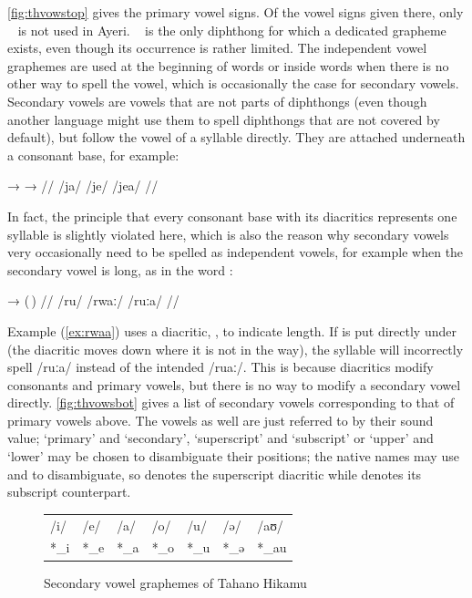 \autoref{fig:thvowstop} gives the primary vowel signs. Of the vowel signs given 
there, only ~ is not used in Ayeri. ~ is the 
only diphthong for which a dedicated grapheme exists, even though its occurrence 
is rather limited. The independent vowel graphemes are used at the beginning of 
words or inside words when there is no other way to spell the vowel, which is 
occasionally the case for secondary vowels. Secondary vowels are vowels that are 
not parts of diphthongs (even though another language might use them to spell 
diphthongs that are not covered by default), but follow the vowel of a syllable 
directly. They are attached underneath a consonant base, for example:

\ex[lingstyle=thex]\begingl
	\gla {}	→		→	 //
	\glb /ja/	{}	/je/		{}	/jea/ //
\endgl\xe

In fact, the principle that every consonant base with its diacritics represents 
one syllable is slightly violated here, which is also the reason why secondary 
vowels very occasionally need to be spelled as independent vowels, for example 
when the secondary vowel is long, as in the word :

\ex[lingstyle=thex]\label{ex:rwaa}\begingl
	\gla {}	→		\quad	(\,) //
	\glb /ru/	{}	/rwaː/ 		\quad	/ruːa/ //
\endgl\xe

Example (\ref{ex:rwaa}) uses a diacritic, , to indicate length. If 
is put directly under  (the  diacritic moves down where 
it is not in the way), the syllable will incorrectly spell /ruːa/ instead of 
the intended /ruaː/. This is because diacritics modify consonants and primary 
vowels, but there is no way to modify a secondary vowel directly. 
\autoref{fig:thvowsbot} gives a list of secondary vowels corresponding to that 
of primary vowels above. The vowels as well are just referred to by their sound 
value; `primary' and `secondary', `superscript' and `subscript' or `upper' and 
`lower' may be chosen to disambiguate their positions; the native names may use 
 and  to disambiguate, so  denotes the superscript  diacritic while  denotes its subscript counterpart.

\begin{figure}[ht]
\caption{Secondary vowel graphemes of Tahano Hikamu}

\begin{tabu} to \linewidth{X[c] X[c] X[c] X[c] X[c] X[c] X[c]}
\toprule
\tableheaderfont	/i/ & /e/ & /a/ & /o/ & /u/ & /ə/ & /aʊ/ \\
\rowfont{\Tagati\huge}	*\_i & *\_e & *\_a & *\_o & *\_u & *\_ə & *\_au \\

\bottomrule
\end{tabu}
\label{fig:thvowsbot}
\end{figure}

